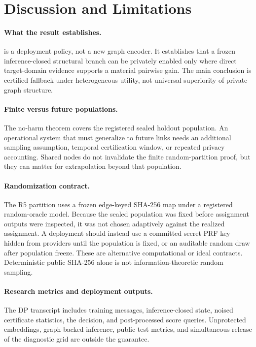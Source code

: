 \section{Discussion and Limitations}
\label{sec:discussion}

\paragraph{What the result establishes.}
\method{} is a deployment policy, not a new graph encoder. It establishes that
a frozen inference-closed structural branch can be privately enabled only
where direct target-domain evidence supports a material pairwise gain. The
main conclusion is certified fallback under heterogeneous utility, not
universal superiority of private graph structure.

\paragraph{Finite versus future populations.}
The no-harm theorem covers the registered sealed holdout population. An
operational system that must generalize to future links needs an additional
sampling assumption, temporal certification window, or repeated privacy
accounting. Shared nodes do not invalidate the finite random-partition proof,
but they can matter for extrapolation beyond that population.

\paragraph{Randomization contract.}
The R5 partition uses a frozen edge-keyed SHA-256 map under a registered
random-oracle model. Because the sealed population was fixed before assignment
outputs were inspected, it was not chosen adaptively against the realized
assignment. A deployment should instead use a committed secret PRF key hidden
from providers until the population is fixed, or an auditable random draw
after population freeze. These are alternative computational or ideal
contracts. Deterministic public SHA-256 alone is not information-theoretic
random sampling.

\paragraph{Research metrics and deployment outputs.}
The DP transcript includes training messages, inference-closed state, noised
certificate statistics, the decision, and post-processed score queries.
Unprotected embeddings, graph-backed inference, public test metrics, and
simultaneous release of the diagnostic grid are outside the guarantee.

